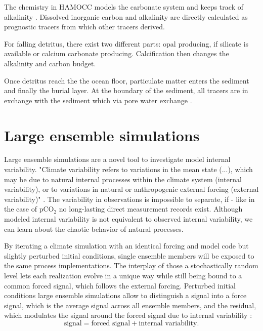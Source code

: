 The chemistry in \acs{HAMOCC} models the carbonate system and keeps track of alkalinity \citep{Maier-Reimer1993}. Dissolved inorganic carbon and alkalinity are directly calculated as prognostic tracers from which other tracers derived.

For falling detritus, there exist two different parts: opal producing, if silicate is available or calcium carbonate producing. Calcification then changes the alkalinity and carbon budget.

Once detritus reach the the ocean floor, particulate matter enters the sediment and finally the burial layer. At the boundary of the sediment, all tracers are in exchange with the sediment which via pore water exchange \citep{Heinze1999}.


\section{Large ensemble simulations}
\label{sec:PICLE}
Large ensemble simulations are a novel tool to investigate model internal variability. "Climate variability refers to variations in the mean state (...), which may be due to natural internal processes within the climate system (internal variability), or to variations in natural or anthropogenic external forcing (external variability)" \citep{IPCC}. The variability in observations is impossible to separate, if - like in the case of pCO$_2$ no long-lasting direct measurement records exist.
Although modeled internal variability is not equivalent to observed internal variability, we can learn about the chaotic behavior of natural processes.

By iterating a climate simulation with an identical forcing and model code but slightly perturbed initial conditions, single ensemble members will be exposed to the same process implementations. The interplay of those a stochastically random level lets each realization evolve in a unique way while still being bound to a common forced signal, which follows the external forcing. Perturbed initial conditions large ensemble simulations allow to distinguish a signal into a force signal, which is the average signal across all ensemble members, and the residual, which modulates the signal around the forced signal due to internal variability \citep{ilyinaletter2016,McKinley2017}: 
\[ \text{signal}=\text{forced signal}+\text{internal variability}.\]

